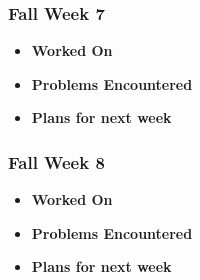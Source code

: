 \documentclass[compsoc,draftclsnofoot,onecolumn,10pt]{IEEEtran}
\begin{document}
\subsubsection{Fall Week 7}
\begin{itemize}
    \item {\textbf{Worked On}}
    \begin{itemize}

    \end{itemize}

    \item {\textbf{Problems Encountered}}
    \begin{itemize}

    \end{itemize}

    \item{\textbf{Plans for next week}}
    \begin{itemize}

    \end{itemize}

\end{itemize}

\subsubsection{Fall Week 8}
\begin{itemize}
    \item {\textbf{Worked On}}
    \begin{itemize}

    \end{itemize}

    \item {\textbf{Problems Encountered}}
    \begin{itemize}

    \end{itemize}

    \item{\textbf{Plans for next week}}
    \begin{itemize}

    \end{itemize}

\end{itemize}
\end{document}
